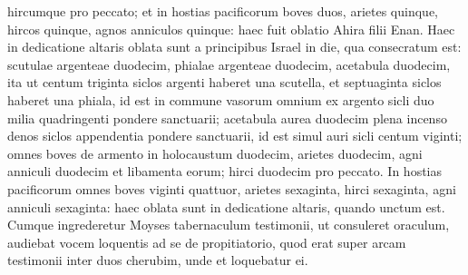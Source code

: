 \begin{biblechapter}
\verse hircumque pro peccato; 
\verse et in hostias pacificorum boves duos, arietes quinque, hircos quinque, agnos anniculos quinque: haec fuit oblatio Ahira filii Enan. 
\verse Haec in dedicatione altaris oblata sunt a principibus Israel in die, qua consecratum est: scutulae argenteae duodecim, phialae argenteae duodecim, acetabula duodecim, 
\verse ita ut centum triginta siclos argenti haberet una scutella, et septuaginta siclos haberet una phiala, id est in commune vasorum omnium ex argento sicli duo milia quadringenti pondere sanctuarii; 
\verse acetabula aurea duodecim plena incenso denos siclos appendentia pondere sanctuarii, id est simul auri sicli centum viginti; 
\verse omnes boves de armento in holocaustum duodecim, arietes duodecim, agni anniculi duodecim et libamenta eorum; hirci duodecim pro peccato. 
\verse In hostias pacificorum omnes boves viginti quattuor, arietes sexaginta, hirci sexaginta, agni anniculi sexaginta: haec oblata sunt in dedicatione altaris, quando unctum est. 
\verse Cumque ingrederetur Moyses tabernaculum testimonii, ut consuleret oraculum, audiebat vocem loquentis ad se de propitiatorio, quod erat super arcam testimonii inter duos cherubim, unde et loquebatur ei. 
\end{biblechapter}

